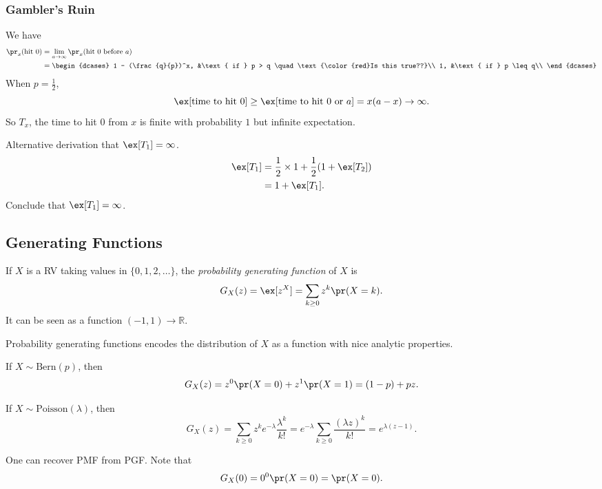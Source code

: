\subsubsection{Gambler's Ruin}
We have
\begin{align*}
    \pr_x(\text{hit }0) &= \lim_{a \to \infty} \pr_x(\text{hit }0\text{ before }a)\\
    &= \begin{dcases}
        1 - (\frac{q}{p})^x, &\text{ if } p > q \quad\text{\color{red}Is this true??}\\
        1, &\text{ if } p \leq q\\
    \end{dcases}
\end{align*}
When \(p = \frac{1}{2}\),
\[
    \ex[\text{time to hit }0] \geq \ex[\text{time to hit }0\text{ or }a] = x(a - x) \to \infty.
\]
So \(T_x\), the time to hit \(0\) from \(x\) is finite with probability \(1\) but infinite expectation.

\begin{remark}
    Alternative derivation that \(\ex[T_1] = \infty\).
    \begin{align*}
        \ex[T_1] &= \frac{1}{2}\times 1 + \frac{1}{2}(1 + \ex[T_2])\\
        &= 1 + \ex[T_1].
    \end{align*}
    Conclude that \(\ex[T_1] = \infty\).
\end{remark}
\subsection{Generating Functions}
\begin{definition}{}{}
    If \(X\) is a RV taking values in \(\{0,1,2,\dots\}\), the \textit{probability generating function} of \(X\) is
    \[
        G_X(z) = \ex[z^X] = \sum_{k \geq 0}z^k \pr(X = k).
    \]
    It can be seen as a function \((-1,1) \to \mathbb{R}\).
\end{definition}
\begin{remark}
    Probability generating functions encodes the distribution of \(X\) as a function with nice analytic properties.
\end{remark}
\begin{example}
    If \(X \sim \mathrm{Bern}(p)\), then
    \[
        G_X(z) = z^0 \pr(X=0) + z^1\pr(X = 1) = (1-p) + pz.
    \]
\end{example}
\begin{example}
    If \(X \sim \mathrm{Poisson}(\lambda)\), then
    \[
        G_X(z) = \sum_{k \geq 0}z^k e^{-\lambda}\frac{\lambda^k}{k!} = e^{-\lambda}\sum_{k\geq 0}\frac{(\lambda z)^k}{k!} = e^{\lambda(z-1)}.
    \]
\end{example}
One can recover PMF from PGF. Note that
\[
    G_X(0) = 0^0 \pr(X=0) = \pr(X=0).
\]